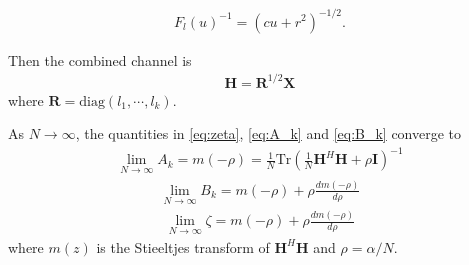 \documentclass[12pt,journal,draftclsnofoot,onecolumn]{IEEEtran}
\begin{document}
\begin{eqnarray}
F_l(u)^{-1} = \left(cu + r^2\right)^{-1/2}.
\end{eqnarray}

Then the combined channel is 
\begin{eqnarray}
\mathbf{H} = \mathbf{R}^{1/2}\mathbf{X}
\end{eqnarray}
where $\mathbf{R} = \mathrm{diag}\left(l_1,\cdots,l_k\right)$.


As $N \to \infty$, the quantities in \eqref{eq:zeta}, \eqref{eq:A_k} and \eqref{eq:B_k} converge to
\begin{eqnarray}
\lim_{N \to \infty}A_k = m(-\rho) = \frac{1}{N}\mathrm{Tr}\left(\frac{1}{N}\mathbf{H}^H\mathbf{H} + \rho\mathbf{I}\right)^{-1} 
\end{eqnarray}
\begin{eqnarray}
\lim_{N \to \infty}B_k = m(-\rho) +\rho\frac{dm(-\rho)}{d\rho}
\end{eqnarray}
\begin{eqnarray}
\lim_{N \to \infty}\zeta = m(-\rho) +\rho\frac{dm(-\rho)}{d\rho}
\end{eqnarray}
where $m(z)$ is the Stieeltjes transform of $\mathbf{H}^H\mathbf{H}$ and $\rho = \alpha/N$.
%
\end{document}
